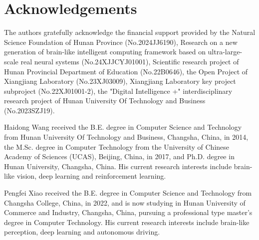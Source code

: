 \documentclass[lettersize,journal]{IEEEtran}
\begin{document}
\newenvironment{acks}{\section*{Acknowledgements}}{}
\begin{acks}
The authors gratefully acknowledge the financial support provided by the Natural Science Foundation of Hunan Province (No.2024JJ6190), Research on a new generation of brain-like intelligent computing framework based on ultra-large-scale real neural systems (No.24XJJCYJ01001), Scientific research project of Hunan Provincial Department of Education (No.22B0646), the Open Project of Xiangjiang Laboratory (No.23XJ03009), Xiangjiang Laboratory key project subproject (No.22XJ01001-2), the "Digital Intelligence +" interdisciplinary research project of Hunan University Of Technology and Business (No.2023SZJ19).
\end{acks}





\begin{IEEEbiography}
	{Haidong Wang}
	received the B.E. degree in Computer Science and Technology from Hunan University Of Technology and Business, Changsha, China, in 2014, the M.Sc. degree in Computer Technology from the University of Chinese Academy of Sciences (UCAS), Beijing, 	China, in 2017, and Ph.D. degree in Hunan University, Changsha, China. His current research interests include brain-like vision, deep learning and reinforcement learning.
\end{IEEEbiography}

\begin{IEEEbiography}
	{Pengfei Xiao}
	received the B.E. degree in Computer Science and Technology from Changsha College, China, in 2022, and is now studying in Hunan University of Commerce and Industry, Changsha, China, pursuing a professional type master's degree in Computer Technology. His current research interests include brain-like perception, deep learning and autonomous driving.
\end{IEEEbiography}
\end{document}
